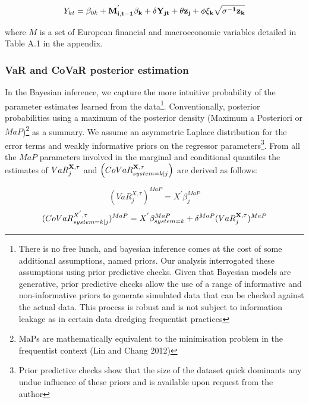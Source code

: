 \documentclass[
  10pt,
]{article}
\begin{document}
\begin{equation}\label{eq:eq5}
Y_{kt}=\beta_{0k}+\bf{M^{'}_{i,t-1}} \bf{\beta_k} +\delta Y_{jt}+\theta z_j+\phi\xi_k\sqrt{\sigma^{-1}z_k}
\end{equation}

where \(M\) is a set of European financial and macroeconomic variables
detailed in Table A.1 in the appendix.

\hypertarget{var-and-covar-posterior-estimation}{%
\subsubsection{VaR and CoVaR posterior
estimation}\label{var-and-covar-posterior-estimation}}

In the Bayesian inference, we capture the more intuitive probability of
the parameter estimates learned from the data\footnote{There is no free
  lunch, and bayesian inference comes at the cost of some additional
  assumptions, named priors. Our analysis interrogated these assumptions
  using prior predictive checks. Given that Bayesian models are
  generative, prior predictive checks allow the use of a range of
  informative and non-informative priors to generate simulated data that
  can be checked against the actual data. This process is robust and is
  not subject to information leakage as in certain data dredging
  frequentist practices}. Conventionally, posterior probabilities using
a maximum of the posterior density (Maximum a Posteriori or
\(MaP\))\footnote{MaPs are mathematically equivalent to the minimisation
  problem in the frequentist context (Lin and Chang 2012)} as a summary.
We assume an asymmetric Laplace distribution for the error terms and
weakly informative priors on the regressor parameters\footnote{Prior
  predictive checks show that the size of the dataset quick dominants
  any undue influence of these priors and is available upon request from
  the author}. From all the \(MaP\) parameters involved in the marginal
and conditional quantiles the estimates of \(VaR^{\bf{X},\tau}_j\) and
\(\left( CoVaR_{system=k|j}^{\bf{X},\tau} \right)\) are derived as
follows:

\begin{equation}\label{eq:eq6}
(VaR^{X,\tau}_j)^{MaP} = X^{'}\beta_j^{MaP}
\end{equation} \begin{equation}\label{eq:eq7}
(CoVaR_{system=k|j}^{X^{'},\tau})^{MaP} = X^{'} \beta_{system=k}^{MaP}+\delta^{MaP}(VaR^{\bf{X},\tau}_j)^{MaP}
\end{equation}
\end{document}
